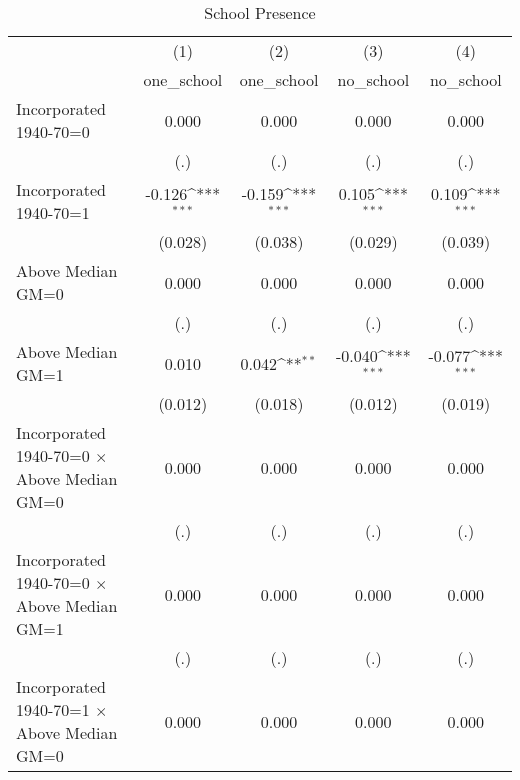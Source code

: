 \begin{table}[htbp]\centering
\def\sym#1{\ifmmode^{#1}\else\(^{#1}\)\fi}
\caption{School Presence}
\begin{tabular}{l*{4}{c}}
\hline\hline
                    &\multicolumn{1}{c}{(1)}&\multicolumn{1}{c}{(2)}&\multicolumn{1}{c}{(3)}&\multicolumn{1}{c}{(4)}\\
                    &\multicolumn{1}{c}{one\_school}&\multicolumn{1}{c}{one\_school}&\multicolumn{1}{c}{no\_school}&\multicolumn{1}{c}{no\_school}\\
\hline
Incorporated 1940-70=0&       0.000         &       0.000         &       0.000         &       0.000         \\
                    &         (.)         &         (.)         &         (.)         &         (.)         \\
[1em]
Incorporated 1940-70=1&      -0.126\sym{***}&      -0.159\sym{***}&       0.105\sym{***}&       0.109\sym{***}\\
                    &     (0.028)         &     (0.038)         &     (0.029)         &     (0.039)         \\
[1em]
Above Median GM=0   &       0.000         &       0.000         &       0.000         &       0.000         \\
                    &         (.)         &         (.)         &         (.)         &         (.)         \\
[1em]
Above Median GM=1   &       0.010         &       0.042\sym{**} &      -0.040\sym{***}&      -0.077\sym{***}\\
                    &     (0.012)         &     (0.018)         &     (0.012)         &     (0.019)         \\
[1em]
Incorporated 1940-70=0 $\times$ Above Median GM=0&       0.000         &       0.000         &       0.000         &       0.000         \\
                    &         (.)         &         (.)         &         (.)         &         (.)         \\
[1em]
Incorporated 1940-70=0 $\times$ Above Median GM=1&       0.000         &       0.000         &       0.000         &       0.000         \\
                    &         (.)         &         (.)         &         (.)         &         (.)         \\
[1em]
Incorporated 1940-70=1 $\times$ Above Median GM=0&       0.000         &       0.000         &       0.000         &       0.000         \\

\end{tabular}
\end{table}

